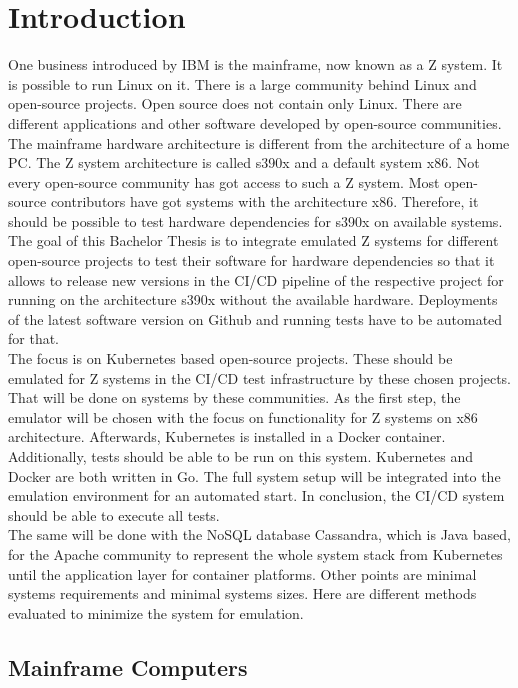\chapter{Introduction}\label{ch:intro}

One business introduced by IBM is the mainframe, now known as a Z system. It is possible to run Linux on it. There is a large community behind Linux and open-source projects. Open source does not contain only \gls{Linux}. There are different applications and other software developed by open-source communities. The mainframe hardware architecture is different from the architecture of a home PC. The Z system architecture is called \gls{s390x} and a default system \gls{x86}. Not every open-source community has got access to such a Z system. Most open-source contributors have got systems with the architecture x86. Therefore, it should be possible to test hardware dependencies for s390x on available systems. The goal of this Bachelor Thesis is to integrate emulated Z systems for different open-source projects to test their software for hardware dependencies so that it allows to release new versions in the CI/CD pipeline of the respective project for running on the architecture s390x without the available hardware. Deployments of the latest software version on Github and running tests have to be automated for that.\\
The focus is on Kubernetes based open-source projects. These should be emulated for Z systems in the \gls{CI/CD} test infrastructure by these chosen projects. That will be done on systems by these communities. As the first step, the emulator will be chosen with the focus on functionality for Z systems on x86 architecture. Afterwards, Kubernetes is installed in a Docker container. Additionally, tests should be able to be run on this system. Kubernetes and Docker are both written in Go. The full system setup will be integrated into the emulation environment for an automated start. In conclusion, the CI/CD system should be able to execute all tests. \\
The same will be done with the NoSQL database Cassandra, which is Java based, for the Apache community to represent the whole system stack from Kubernetes until the \gls{application layer} for container platforms. Other points are minimal systems requirements and minimal systems sizes. Here are different methods evaluated to minimize the system for emulation.


\section{Mainframe Computers}


